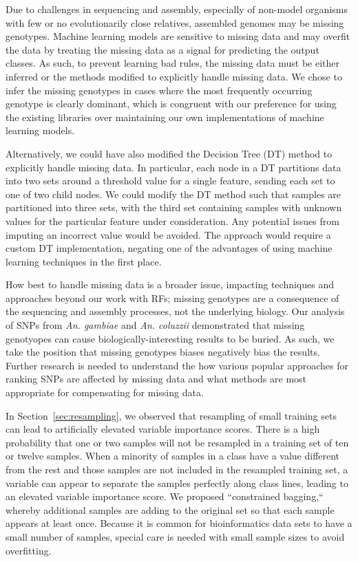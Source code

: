 Due to challenges in sequencing and assembly, especially of non-model organisms with few or no evolutionarily close relatives, assembled genomes may be missing genotypes.  Machine learning models are sensitive to missing data and may overfit the data by treating the missing data as a signal for predicting the output classes.  As such, to prevent learning bad rules, the missing data must be either inferred or the methods modified to explicitly handle missing data.  We chose to infer the missing genotypes in cases where the most frequently occurring genotype is clearly dominant, which is congruent with our preference for using the existing libraries over maintaining our own implementations of machine learning models.  

Alternatively, we could have also modified the Decision Tree (DT) method to explicitly handle missing data.  In particular, each node in a DT partitions data into two sets around a threshold value for a single feature, sending each set to one of two child nodes.  We could modify the DT method such that samples are partitioned into three sets, with the third set containing samples with unknown values for the particular feature under consideration.  Any potential issues from imputing an incorrect value would be avoided. The approach would require a custom DT implementation, negating one of the advantages of using machine learning techniques in the first place.

How best to handle missing data is a broader issue, impacting techniques and approaches beyond our work with RFs; missing genotypes are a consequence of the sequencing and assembly processes, not the underlying biology.  Our analysis of SNPs from \emph{An. gambiae} and \emph{An. coluzzii} demonstrated that missing genotyopes can cause biologically-interesting results to be buried.  As such, we take the position that missing genotypes biases negatively bias the results. Further research is needed to understand the how various popular approaches for ranking SNPs are affected by missing data and what methods are most appropriate for compensating for missing data.

In Section~\ref{sec:resampling}, we observed that resampling of small training sets can lead to artificially elevated variable importance scores. There is a high probability that one or two samples will not be resampled in a training set of ten or twelve samples.  When a minority of samples in a class have a value different from the rest and those samples are not included in the resampled training set, a variable can appear to separate the samples perfectly along class lines, leading to an elevated variable importance score.  We proposed ``constrained bagging,`` whereby additional samples are adding to the original set so that each sample appears at least once. Because it is common for bioinformatics data sets to have a small number of samples, special care is needed with small sample sizes to avoid overfitting.

